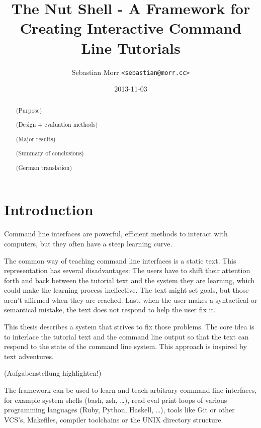 \documentclass[a4paper,twoside,abstract=on,cleardoublepage=empty,numbers=noenddot,toc=bib]{scrreprt}
\title{The Nut Shell - A Framework for Creating Interactive Command Line Tutorials}
\author{Sebastian Morr \texttt{<sebastian@morr.cc>}}
\date{2013-11-03}
\begin{document}
\maketitle
\restoregeometry

\clearpage
{}

\begin{abstract}

    \blindtext

    (Purpose)

    (Design + evaluation methods)

    (Major results)

    (Summary of conclusions)
\end{abstract}

%
\begin{abstract}
    \blindtext

    (German translation)
\end{abstract}
%

\setcounter{tocdepth}{2}
\tableofcontents

\cleardoublepage
{}

\chapter{Introduction}

Command line interfaces are powerful, efficient methods to interact with computers, but they often have a steep learning curve.

The common way of teaching command line interfaces is a static text. This representation has several disadvantages: The users have to shift their attention forth and back between the tutorial text and the system they are learning, which could make the learning process ineffective. The text might set goals, but those aren't affirmed when they are reached. Last, when the user makes a syntactical or semantical mistake, the text does not respond to help the user fix it.

This thesis describes a system that strives to fix those problems. The core idea is to interlace the tutorial text and the command line output so that the text can respond to the state of the command line system. This approach is inspired by text adventures.

(Aufgabenstellung highlighten!)

The framework can be used to learn and teach arbitrary command line interfaces, for example system shells (bash, zsh, …), read eval print loops of various programming languages (Ruby, Python, Haskell, …), tools like Git or other VCS's, Makefiles, compiler toolchains or the UNIX directory structure.
\end{document}
